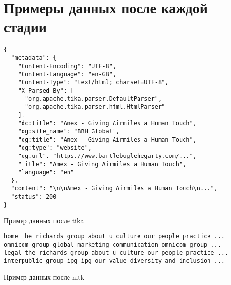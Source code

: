 \appendix
\chapter{Примеры данных после каждой стадии}
\begin{listing}[!ht]
\begin{verbatim}
{
  "metadata": {
    "Content-Encoding": "UTF-8",
    "Content-Language": "en-GB",
    "Content-Type": "text/html; charset=UTF-8",
    "X-Parsed-By": [
      "org.apache.tika.parser.DefaultParser",
      "org.apache.tika.parser.html.HtmlParser"
    ],
    "dc:title": "Amex - Giving Airmiles a Human Touch",
    "og:site_name": "BBH Global",
    "og:title": "Amex - Giving Airmiles a Human Touch",
    "og:type": "website",
    "og:url": "https://www.bartleboglehegarty.com/...",
    "title": "Amex - Giving Airmiles a Human Touch",
    "language": "en"
  },
  "content": "\n\nAmex - Giving Airmiles a Human Touch\n...",
  "status": 200
}
\end{verbatim}
\caption{Пример данных после \gls{tika}}
\label{listing:tika-example}
\end{listing}

\begin{listing}[!ht]
\begin{verbatim}
home the richards group about u culture our people practice ...
omnicom group global marketing communication omnicom group ...
legal the richards group about u culture our people practice ...
interpublic group ipg ipg our value diversity and inclusion ... 
\end{verbatim}
\caption{Пример данных после \gls{nltk}}
\label{listing:tokenizer-example}
\end{listing}
